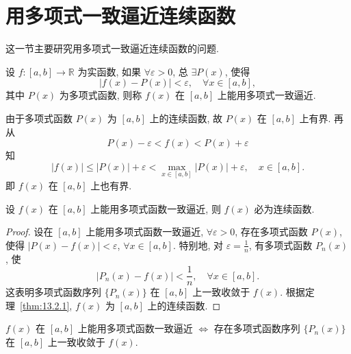 \section{用多项式一致逼近连续函数}\label{sec:14.3}

这一节主要研究用多项式一致逼近连续函数的问题.

\begin{definition}\label{def:14.3.1}
设 $f\colon[a,b]\to\mathbb{R}$ 为实函数, 如果 $\forall\varepsilon>0$, 总 $\exists P(x)$, 使得
\[
  |f(x)-P(x)|<\varepsilon,\quad\forall x\in[a,b],
\]
其中 $P(x)$ 为多项式函数, 则称 $f(x)$ 在 $[a,b]$ 上能用多项式一致逼近.
\end{definition}

由于多项式函数 $P(x)$ 为 $[a,b]$ 上的连续函数, 故 $P(x)$ 在 $[a,b]$ 上有界. 再从
\[
  P(x)-\varepsilon<f(x)<P(x)+\varepsilon
\]
知
\[
  |f(x)|\leqslant|P(x)|+\varepsilon<\max\limits_{x\in[a,b]}|P(x)|+\varepsilon,\quad x\in[a,b].
\]
即 $f(x)$ 在 $[a,b]$ 上也有界.

\begin{theorem}[用多项式函数一致逼近的必要条件]\label{thm:14.3.1}
设 $f(x)$ 在 $[a,b]$ 上能用多项式函数一致逼近, 则 $f(x)$ 必为连续函数.
\end{theorem}

\begin{proof}
设在 $[a,b]$ 上能用多项式函数一致逼近, $\forall\varepsilon>0$, 存在多项式函数 $P(x)$, 使得 $|P(x)-f(x)|<\varepsilon$, $\forall x\in[a,b]$. 特别地, 对 $\varepsilon=\frac{1}{n}$, 有多项式函数 $P_{n}(x)$, 使
\[
  |P_{n}(x)-f(x)|<\frac{1}{n},\quad\forall x\in[a,b].
\]
这表明多项式函数序列 $\{P_{n}(x)\}$ 在 $[a,b]$ 上一致收敛于 $f(x)$. 根据定理~\ref{thm:13.2.1}, $f(x)$ 为 $[a,b]$ 上的连续函数.
\end{proof}

\begin{theorem}[用多项式函数一致逼近的充要条件]\label{thm:14.3.2}
$f(x)$ 在 $[a,b]$ 上能用多项式函数一致逼近 $\Leftrightarrow$ 存在多项式函数序列 $\{P_{n}(x)\}$ 在 $[a,b]$ 上一致收敛于 $f(x)$.
\end{theorem}

